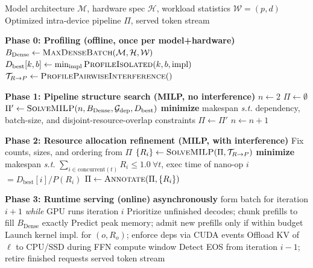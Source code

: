 \documentclass[manuscript,review]{acmart}
\newcommand{\nf}{NanoFlow\xspace}   %
\newcommand{\Bdense}{B_{\mathrm{Dense}}}
\begin{document}
\begin{algorithm}[t]
\caption{\nf: Auto-search and Runtime Execution}
\label{alg:nanoflow}
\begin{algorithmic}[1]
\Require Model architecture $\mathcal{M}$, hardware spec $\mathcal{H}$,
         workload statistics $\mathcal{W} = (p, d)$
\Ensure  Optimized intra-device pipeline $\Pi$, served token stream

\Statex \textbf{Phase 0: Profiling (offline, once per model+hardware)}
\State $\Bdense \gets \Call{MaxDenseBatch}{\mathcal{M}, \mathcal{H}, \mathcal{W}}$
  \ForAll{$b \in \{128, 256, \ldots, \Bdense\}$}
    \State $D_{\mathrm{best}}[k, b] \gets \min_{\text{impl}}
            \Call{ProfileIsolated}{k, b, \text{impl}}$
  \EndFor
\EndFor
\State $\mathcal{T}_{R \to P} \gets \Call{ProfilePairwiseInterference}{ }$

\Statex \textbf{Phase 1: Pipeline structure search (MILP, no interference)}
\State $n \gets 2$ 
\State $\Pi \gets \emptyset$
\Repeat
  \State $\Pi' \gets \Call{SolveMILP}{n, \Bdense, \mathcal{G}_{\mathrm{dep}}, D_{\mathrm{best}}}$
  \Statex \hspace{\algorithmicindent}
          \textbf{minimize} makespan \textit{s.t.}
          dependency, batch-size, and
  \Statex \hspace{\algorithmicindent}
          disjoint-resource-overlap constraints
    \State $\Pi \gets \Pi'$
  \EndIf
  \State $n \gets n + 1$ 

\Statex \textbf{Phase 2: Resource allocation refinement (MILP, with interference)}
\State Fix counts, sizes, and ordering from $\Pi$
\State $\{R_i\} \gets \Call{SolveMILP}{\Pi, \mathcal{T}_{R \to P}}$
\Statex \hspace{\algorithmicindent}
        \textbf{minimize} makespan \textit{s.t.}
        $\sum_{i \in \text{concurrent}(t)} R_i \le 1.0\ \forall t$,
\Statex \hspace{\algorithmicindent}
        exec time of nano-op $i$ $= D_{\mathrm{best}}[i] / P(R_i)$
\State $\Pi \gets \Call{Annotate}{\Pi, \{R_i\}}$

\Statex \textbf{Phase 3: Runtime serving (online)}
  \State \textbf{asynchronously} form batch for iteration $i{+}1$
         \textit{while} GPU runs iteration $i$
  \State Prioritize unfinished decodes; chunk prefills to fill $\Bdense$ exactly
  \State Predict peak memory; admit new prefills only if within budget
      \State Launch kernel impl. for $(o, R_o)$; enforce deps via CUDA events
      \State Offload KV of $\ell$ to CPU/SSD during FFN compute window
    \EndFor
  \EndFor
  \State Detect EOS from iteration $i{-}1$; retire finished requests
\EndWhile
\State \Return served token stream
\end{algorithmic}
\end{algorithm}
\end{document}
